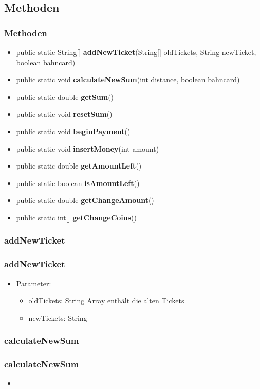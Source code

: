 \documentclass[final]{beamer}
\begin{document}
\subsection{Methoden}
\begin{frame}
	\frametitle{Methoden}
	\begin{itemize}
		\item{{\color{blue}public static} String[] \textbf{addNewTicket}(String[] oldTickets, String newTicket, {\color{blue}boolean} bahncard)}
		\item{{\color{blue}public static void} \textbf{calculateNewSum}({\color{blue}int} distance, {\color{blue}boolean} bahncard)}
		\item{{\color{blue}public static double} \textbf{getSum}()}
		\item{{\color{blue}public static void} \textbf{resetSum}()}
		\item{{\color{blue}public static void} \textbf{beginPayment}()}
		\item{{\color{blue}public static void} \textbf{insertMoney}({\color{blue}int} amount)}
		\item{{\color{blue}public static double} \textbf{getAmountLeft}()}
		\item{{\color{blue}public static boolean} \textbf{isAmountLeft}()}
		\item{{\color{blue}public static double} \textbf{getChangeAmount}()}
		\item{{\color{blue}public static int}[] \textbf{getChangeCoins}()}
	\end{itemize}
\end{frame}

\subsubsection{addNewTicket}
\begin{frame}
	\frametitle{addNewTicket}
	\begin{itemize}
		\item{Parameter:}
			\begin{itemize}
				\item{oldTickets: String Array enthält die alten Tickets}
				\item{newTickets: String}
			\end{itemize}
	\end{itemize}
\end{frame}

\subsubsection{calculateNewSum}
\begin{frame}
	\frametitle{calculateNewSum}
	\begin{itemize}
		\item{}
	\end{itemize}
\end{frame}
\end{document}
